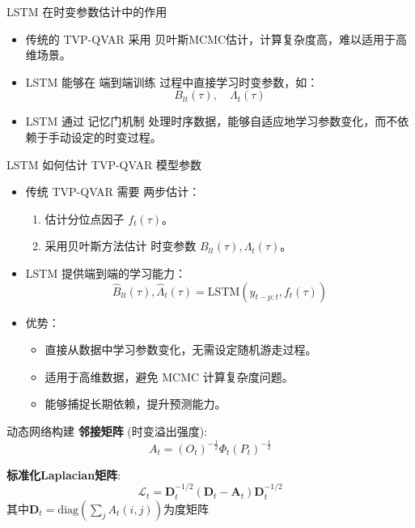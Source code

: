 \documentclass{beamer}
\begin{document}
\begin{frame}{LSTM 在时变参数估计中的作用}
  \begin{itemize}
      \item 传统的 TVP-QVAR 采用 贝叶斯MCMC估计，计算复杂度高，难以适用于高维场景。
      \item LSTM 能够在 端到端训练 过程中直接学习时变参数，如：
      \[
      B_{lt}(\tau), \quad \Lambda_t(\tau)
      \]
      \item LSTM 通过 记忆门机制 处理时序数据，能够自适应地学习参数变化，而不依赖于手动设定的时变过程。
  \end{itemize}
\end{frame}



\begin{frame}{LSTM 如何估计 TVP-QVAR 模型参数}
  \begin{itemize}
      \item 传统 TVP-QVAR 需要 两步估计：
      \begin{enumerate}
          \item 估计分位点因子 \( f_t(\tau) \)。
          \item 采用贝叶斯方法估计 时变参数 \( B_{lt}(\tau), \Lambda_t(\tau) \)。
      \end{enumerate}
      \item LSTM 提供端到端的学习能力：
      \begin{equation}
          \hat{B}_{lt}(\tau), \hat{\Lambda}_t(\tau) = \text{LSTM}(y_{t-p:t}, f_t(\tau))
      \end{equation}
      \item 优势：
      \begin{itemize}
          \item 直接从数据中学习参数变化，无需设定随机游走过程。
          \item 适用于高维数据，避免 MCMC 计算复杂度问题。
          \item 能够捕捉长期依赖，提升预测能力。
      \end{itemize}
  \end{itemize}
\end{frame}


\begin{frame}{动态网络构建}
\textbf{邻接矩阵} (时变溢出强度):
\begin{equation*}
A_t = (O_t)^{-\frac{1}{2}}\Phi_t(P_t)^{-\frac{1}{2}}
\end{equation*}

\textbf{标准化Laplacian矩阵}:
\begin{equation*}
\mathcal{L}_t = \boldsymbol{D}_t^{-1/2} (\boldsymbol{D}_t - \boldsymbol{A}_t) \boldsymbol{D}_t^{-1/2}
\end{equation*}
其中$\boldsymbol{D}_t = \text{diag}(\sum_j A_t(i,j))$为度矩阵
\end{frame}
\end{document}
